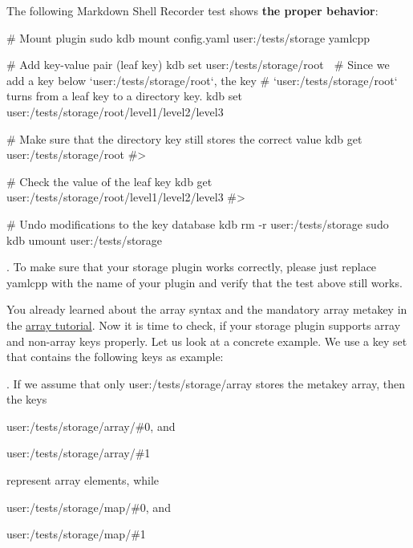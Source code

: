 The following Markdown Shell Recorder test shows {\bfseries the proper behavior}\+:


\begin{DoxyCode}
# Mount plugin
sudo kdb mount config.yaml user:/tests/storage yamlcpp

# Add key-value pair (leaf key)
kdb set user:/tests/storage/root 🐓
# Since we add a key below `user:/tests/storage/root`, the key
# `user:/tests/storage/root` turns from a leaf key to a directory key.
kdb set user:/tests/storage/root/level1/level2/level3 🐣

# Make sure that the directory key still stores the correct value
kdb get user:/tests/storage/root
#> 🐓

# Check the value of the leaf key
kdb get user:/tests/storage/root/level1/level2/level3
#> 🐣

# Undo modifications to the key database
kdb rm -r user:/tests/storage
sudo kdb umount user:/tests/storage
\end{DoxyCode}


. To make sure that your storage plugin works correctly, please just replace {\ttfamily yamlcpp} with the name of your plugin and verify that the test above still works.

You already learned about the array syntax and the mandatory {\ttfamily array} metakey in the \hyperlink{doc_tutorials_arrays_md}{array tutorial}. Now it is time to check, if your storage plugin supports array and non-\/array keys properly. Let us look at a concrete example. We use a key set that contains the following keys as example\+:




. If we assume that only {\ttfamily user\+:/tests/storage/array} stores the metakey {\ttfamily array}, then the keys


\begin{DoxyItemize}
\item {\ttfamily user\+:/tests/storage/array/\#0}, and
\item {\ttfamily user\+:/tests/storage/array/\#1}
\end{DoxyItemize}

represent array elements, while


\begin{DoxyItemize}
\item {\ttfamily user\+:/tests/storage/map/\#0}, and
\item {\ttfamily user\+:/tests/storage/map/\#1}
\end{DoxyItemize}

